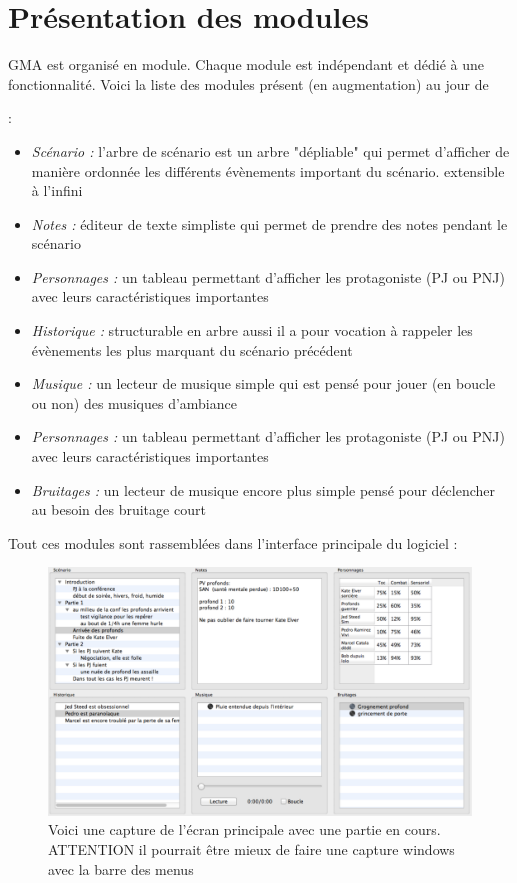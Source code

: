 \documentclass[12pt]{article}
\begin{document}
\section{Présentation des modules}\label{modules}
GMA est organisé en module. Chaque module est indépendant et dédié à une fonctionnalité. Voici la liste des modules présent (en augmentation) au jour de \date{\today} :
\begin{itemize}
    \item \emph{Scénario :} l'arbre de scénario est un arbre "dépliable" qui permet d'afficher de manière ordonnée les différents évènements important du scénario. extensible à l'infini
    \item \emph{Notes :} éditeur de texte simpliste qui permet de prendre des notes pendant le scénario
    \item \emph{Personnages :} un tableau permettant d'afficher les protagoniste (PJ ou PNJ) avec leurs caractéristiques importantes
    \item \emph{Historique :} structurable en arbre aussi il a pour vocation à rappeler les évènements les plus marquant du scénario précédent
    \item \emph{Musique :} un lecteur de musique simple qui est pensé pour jouer (en boucle ou non) des musiques d'ambiance
    \item \emph{Personnages :} un tableau permettant d'afficher les protagoniste (PJ ou PNJ) avec leurs caractéristiques importantes
    \item \emph{Bruitages :} un lecteur de musique encore plus simple pensé pour déclencher au besoin des bruitage court
\end{itemize}
Tout ces modules sont rassemblées dans l'interface principale du logiciel :
\begin{figure}
    \includegraphics[scale=0.15]{screen_scenar_exemple}
    \caption{Voici une capture de l'écran principale avec une partie en cours.
    ATTENTION il pourrait être mieux de faire une capture windows avec la barre des menus}
\end{figure}
\end{document}
